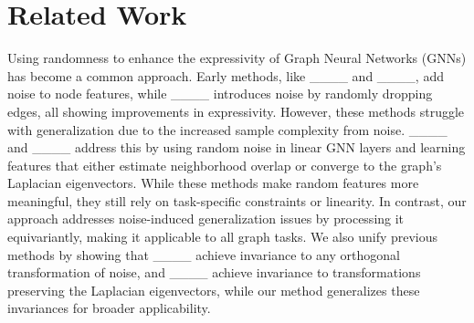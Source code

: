\section{Related Work}
Using randomness to enhance the expressivity of Graph Neural Networks (GNNs) has become a common approach. Early methods, like ____ and ____, add noise to node features, while ____ introduces noise by randomly dropping edges, all showing improvements in expressivity. However, these methods struggle with generalization due to the increased sample complexity from noise. ____ and ____ address this by using random noise in linear GNN layers and learning features that either estimate neighborhood overlap or converge to the graph’s Laplacian eigenvectors. While these methods make random features more meaningful, they still rely on task-specific constraints or linearity. In contrast, our approach addresses noise-induced generalization issues by processing it equivariantly, making it applicable to all graph tasks. We also unify previous methods by showing that ____ achieve invariance to any orthogonal transformation of noise, and ____ achieve invariance to transformations preserving the Laplacian eigenvectors, while our method generalizes these invariances for broader applicability.

